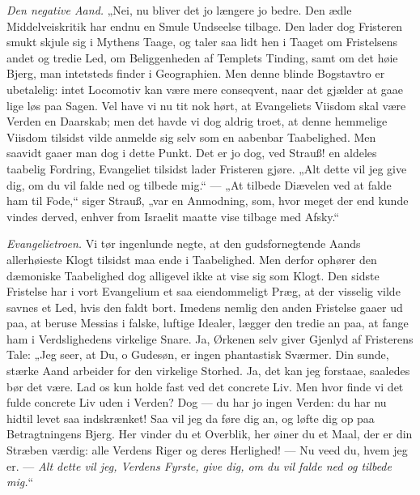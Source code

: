 \documentclass[12pt,a4paper]{book}
\begin{document}
\emph{Den negative Aand.} „Nei, nu bliver det jo længere
jo bedre. Den ædle Middelveiskritik har endnu en Smule Undseelse tilbage. Den lader dog
Fristeren smukt skjule sig i Mythens Taage, og taler saa lidt hen i Taaget om
Fristelsens andet og tredie Led, om Beliggenheden af Templets Tinding, samt om det høie
Bjerg, man intetsteds finder i Geographien. Men denne blinde Bogstavtro er ubetalelig:
intet Locomotiv kan være mere conseqvent, naar det gjælder at gaae lige løs paa Sagen.
Vel have vi nu tit nok hørt, at Evangeliets Viisdom skal være Verden en Daarskab; men
det havde vi dog aldrig troet, at denne hemmelige Viisdom tilsidst vilde anmelde sig
selv som en aabenbar Taabelighed. Men saavidt gaaer man dog i dette Punkt. Det er jo
dog, ved Strauß! en aldeles taabelig Fordring, Evangeliet tilsidst lader Fristeren
gjøre. „Alt dette vil jeg give dig, om du vil falde ned og tilbede mig.“ --- „At
tilbede Diævelen ved at falde ham til Fode,“ siger Strauß, „var en Anmodning, som, hvor
meget der end kunde vindes derved, enhver from Israelit maatte vise tilbage med Afsky.“

\emph{Evangelietroen.} Vi tør ingenlunde negte, at den gudsfornegtende Aands
allerhøieste Klogt tilsidst maa ende i Taabelighed. Men derfor ophører den dæmoniske
Taabelighed dog alligevel ikke at vise sig som Klogt. Den sidste Fristelse har i vort
Evangelium et saa eiendommeligt Præg, at der visselig vilde savnes et Led, hvis den
faldt bort. Imedens nemlig den anden Fristelse gaaer ud paa, at beruse Messias i falske,
luftige Idealer, lægger den tredie an paa, at fange ham i Verdslighedens virkelige
Snare. Ja, Ørkenen selv giver Gjenlyd af Fristerens Tale: „Jeg seer, at Du, o Gudesøn,
er ingen phantastisk Sværmer. Din sunde, stærke Aand arbeider for den virkelige Storhed.
Ja, det kan jeg forstaae, saaledes bør det være. Lad os kun holde fast ved det concrete
Liv. Men hvor finde vi det fulde concrete Liv uden i Verden? Dog --- du har jo ingen
Verden: du har nu hidtil levet saa indskrænket! Saa vil jeg da føre dig an, og løfte dig
op paa Betragtningens Bjerg. Her vinder du et Overblik, her øiner du et Maal, der er din
Stræben værdig: alle Verdens Riger og deres Herlighed! --- Nu veed du, hvem jeg er. ---
\emph{Alt dette vil jeg, Verdens Fyrste, give dig, om du vil falde ned og tilbede mig.}“
\end{document}

